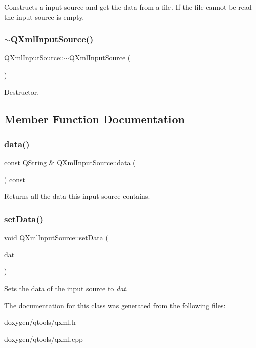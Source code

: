 Constructs a input source and get the data from a file. If the file cannot be read the input source is empty. \mbox{\label{class_q_xml_input_source_ac488a4e4c15218584c36c54bb4d4d78b}} 
\subsubsection{\texorpdfstring{$\sim$QXmlInputSource()}{~QXmlInputSource()}}
{\footnotesize\ttfamily Q\+Xml\+Input\+Source\+::$\sim$\+Q\+Xml\+Input\+Source (\begin{DoxyParamCaption}{ }\end{DoxyParamCaption})\hspace{0.3cm}{\ttfamily [virtual]}}

Destructor. 

\subsection{Member Function Documentation}
\mbox{\label{class_q_xml_input_source_a1e7d5502610edbceed00152d1787234f}} 
\subsubsection{\texorpdfstring{data()}{data()}}
{\footnotesize\ttfamily const \mbox{\hyperlink{class_q_string}{Q\+String}} \& Q\+Xml\+Input\+Source\+::data (\begin{DoxyParamCaption}{ }\end{DoxyParamCaption}) const\hspace{0.3cm}{\ttfamily [virtual]}}

Returns all the data this input source contains. \mbox{\label{class_q_xml_input_source_a3ecfd199af8d72d33a9ef7b919794923}} 
\subsubsection{\texorpdfstring{setData()}{setData()}}
{\footnotesize\ttfamily void Q\+Xml\+Input\+Source\+::set\+Data (\begin{DoxyParamCaption}\item[{const \mbox{\hyperlink{class_q_string}{Q\+String}} \&}]{dat }\end{DoxyParamCaption})\hspace{0.3cm}{\ttfamily [virtual]}}

Sets the data of the input source to {\itshape dat}. 

The documentation for this class was generated from the following files\+:\begin{DoxyCompactItemize}
\item 
doxygen/qtools/qxml.\+h\item 
doxygen/qtools/qxml.\+cpp\end{DoxyCompactItemize}
